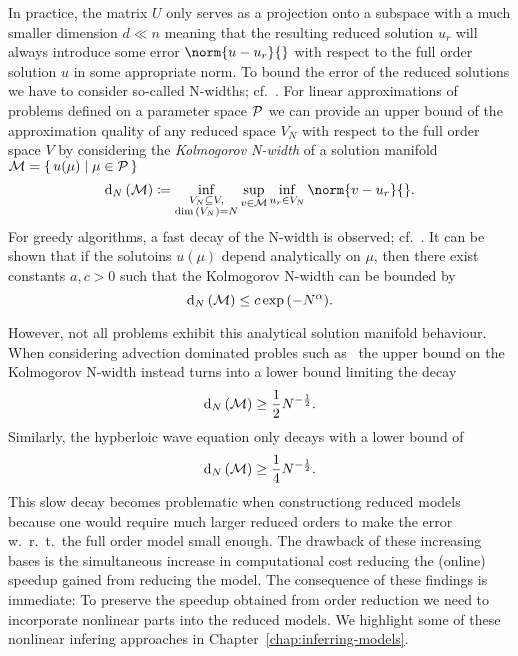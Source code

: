 In practice, the matrix $U$ only serves as a projection onto a subspace with a much smaller dimension $d \ll n$ meaning that the resulting reduced solution $u_r$ will always introduce some error $\norm{u - u_r}{}$ with respect to the full order solution $u$ in some appropriate norm.
To bound the error of the reduced solutions we have to consider so-called N-widths; cf.~\cite{Pinkus1985}.
For linear approximations of problems defined on a parameter space $\mathcal{P}$ we can provide an upper bound of the approximation quality of any reduced space $V_N$ with respect to the full order space $V$ by considering the \emph{Kolmogorov N-width} of a solution manifold $\mathcal{M} = \left\{\,u(\mu)\mid\mu \in \mathcal{P}\,\right\}$
\begin{equation}
    \kolm{\mcl{M}} \coloneqq \inf\limits_{\substack{V_N \subseteq V,\\\dim{(V_N)} = N}} \sup\limits_{v \in \mcl{M}} \inf\limits_{u_r \in V_N} \norm{v - u_r}{}.
\end{equation}
For greedy algorithms, a fast decay of the N-width is observed; cf.~\cite{Binev2011, DeVore2013}.
It can be shown that if the solutoins $u(\mu)$ depend analytically on $\mu$, then there exist constants $a, c > 0$ such that the Kolmogorov N-width can be bounded by
\begin{equation*}
    \mathop{}\!\mathrm{d}_N\left(\mathcal{M}\right) \leq c \exp{(-N^\alpha)}.
\end{equation*}

However, not all problems exhibit this analytical solution manifold behaviour.
When considering advection dominated probles such as~\cite[Section~5.1]{Ohlberger2016} the upper bound on the Kolmogorov N-width instead turns into a lower bound limiting the decay
\begin{equation*}
    \mathop{}\!\mathrm{d}_N\left(\mathcal{M}\right) \geq \frac{1}{2} N^{- \frac{1}{2}}.
\end{equation*}
Similarly, the hypberloic wave equation only decays with a lower bound of
\begin{equation*}
    \mathop{}\!\mathrm{d}_N\left(\mathcal{M}\right) \geq \frac{1}{4} N^{- \frac{1}{2}}.
\end{equation*}
This slow decay becomes problematic when constructiong reduced models because one would require much larger reduced orders to make the error w.\ r.\ t.\ the full order model small enough.
The drawback of these increasing bases is the simultaneous increase in computational cost reducing the (online) speedup gained from reducing the model.
The consequence of these findings is immediate: To preserve the speedup obtained from order reduction we need to incorporate nonlinear parts into the reduced models.
We highlight some of these nonlinear infering approaches in Chapter~\ref{chap:inferring-models}.
